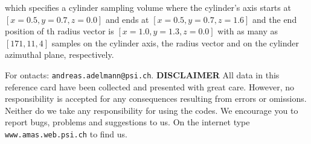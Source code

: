 \documentclass[10pt,landscape,a4paper]{article}
\begin{document}
\begin{multicols}{3}
\noindent which specifies a cylinder sampling volume where the cylinder's
axis starts at $[x=0.5,y=0.7,z=0.0]$ and ends at $[x=0.5,y=0.7,z=1.6]$ and
the end position of th radius vector is $[x=1.0,y=1.3,z=0.0]$ with
as many as $[171,11,4]$ samples on the cylinder axis, the radius vector
and on the cylinder azimuthal plane, respectively.


{\scriptsize

}

\vspace{2mm}

\scriptsize
For ontacts:
\texttt{andreas.adelmann@psi.ch}.
\noindent \textbf{DISCLAIMER} All data in this reference card have been collected and presented
with great care. However, no responsibility is accepted for any consequences resulting
from errors or omissions. Neither do we take any responsibility for using the codes.
We encourage you to report bugs, problems and suggestions to us. 
\noindent On the internet type \texttt{www.amas.web.psi.ch} to find us.
\end{multicols}
\end{document}
